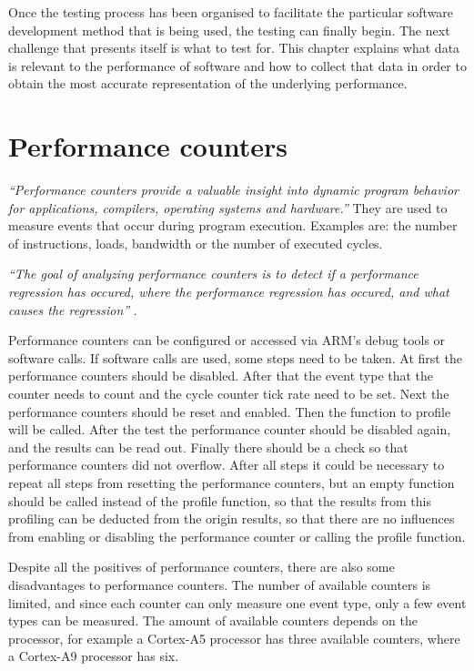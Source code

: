 Once the testing process has been organised to facilitate the particular software development method that is being used, the testing can finally begin. The next challenge that presents itself is what to test for. This chapter explains what data is relevant to the performance of software and how to collect that data in order to obtain the most accurate representation of the underlying performance.


\section{Performance counters}
\textit{``Performance counters provide a valuable insight into dynamic program behavior for applications, compilers, operating systems and hardware.''}\cite{zagha1996performance}
They are used to measure events that occur during program execution. Examples are: the number of instructions, loads, bandwidth or the number of executed cycles.

\textit{``The goal of analyzing performance counters is to detect if a performance regression has occured, where the performance regression has occured, and what causes the regression''} \cite{nguyen2012using}.

Performance counters can be configured or accessed via ARM's debug tools or software calls. If software calls are used, some steps need to be taken. At first the performance counters should be disabled. After that the event type that the counter needs to count and the cycle counter tick rate need to be set. Next the performance counters should be reset and enabled. Then the function to profile will be called. After the test the performance counter should be disabled again, and the results can be read out. Finally there should be a check so that performance counters did not overflow. After all steps it could be necessary to repeat all steps from resetting the performance counters, but an empty function should be called instead of the profile function, so that the results from this profiling can be deducted from the origin results, so that there are no influences from enabling or disabling the performance counter or calling the profile function.

Despite all the positives of performance counters, there are also some disadvantages to performance counters. The number of available counters is limited, and since each counter can only measure one event type, only a few event types can be measured. The amount of available counters depends on the processor, for example a Cortex-A5 processor has three available counters, where a Cortex-A9 processor has six.

